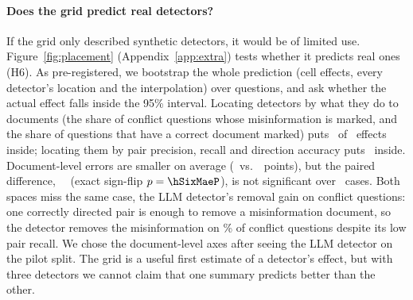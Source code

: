 \paragraph{Does the grid predict real detectors?}

If the grid only described synthetic detectors, it would be of limited use. Figure~\ref{fig:placement} (Appendix~\ref{app:extra}) tests
whether it predicts real ones (H6). As pre-registered, we bootstrap the whole prediction (cell effects, every detector's
location and the interpolation) over questions, and ask whether the actual effect falls inside the 95\% interval.
Locating detectors by what they do to documents (the share of conflict questions whose misinformation is marked, and
the share of questions that have a correct document marked) puts \hSixDocIn\ of \hSixN\ effects inside; locating them
by pair precision, recall and direction accuracy puts \hSixPairIn\ inside. Document-level errors are smaller on
average (\hSixDocMae\ vs.\ \hSixPairMae\ points), but the paired difference, \hSixMaeDiff\ \hSixMaeDiffCI\ (exact
sign-flip $p=\hSixMaeP$), is not significant over \hSixN\ cases. Both spaces miss the same case, the LLM detector's
removal gain on conflict questions: one correctly directed pair is enough to remove a misinformation document, so the
detector removes the misinformation on \misGoneLlm\% of conflict questions despite its low pair recall. We chose the
document-level axes after seeing the LLM detector on the pilot split. The grid is a useful first estimate of a
detector's effect, but with three detectors we cannot claim that one summary predicts better than the other.

